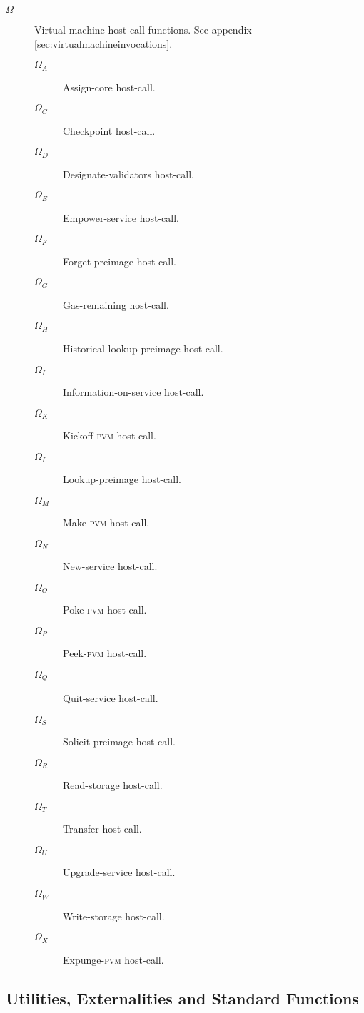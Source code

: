 \begin{description}
  \item[$\Omega$] Virtual machine host-call functions. See appendix \ref{sec:virtualmachineinvocations}. %
  \begin{description}
    \item[$\Omega_A$] Assign-core host-call.
    \item[$\Omega_C$] Checkpoint host-call.
    \item[$\Omega_D$] Designate-validators host-call.
    \item[$\Omega_E$] Empower-service host-call.
    \item[$\Omega_F$] Forget-preimage host-call.
    \item[$\Omega_G$] Gas-remaining host-call.
    \item[$\Omega_H$] Historical-lookup-preimage host-call.
    \item[$\Omega_I$] Information-on-service host-call.
    \item[$\Omega_K$] Kickoff-\textsc{pvm} host-call.
    \item[$\Omega_L$] Lookup-preimage host-call.
    \item[$\Omega_M$] Make-\textsc{pvm} host-call.
    \item[$\Omega_N$] New-service host-call.
    \item[$\Omega_O$] Poke-\textsc{pvm} host-call.
    \item[$\Omega_P$] Peek-\textsc{pvm} host-call.
    \item[$\Omega_Q$] Quit-service host-call.
    \item[$\Omega_S$] Solicit-preimage host-call.
    \item[$\Omega_R$] Read-storage host-call.
    \item[$\Omega_T$] Transfer host-call.
    \item[$\Omega_U$] Upgrade-service host-call.
    \item[$\Omega_W$] Write-storage host-call.
    \item[$\Omega_X$] Expunge-\textsc{pvm} host-call.
  \end{description}
\end{description}

\subsection{Utilities, Externalities and Standard Functions}

